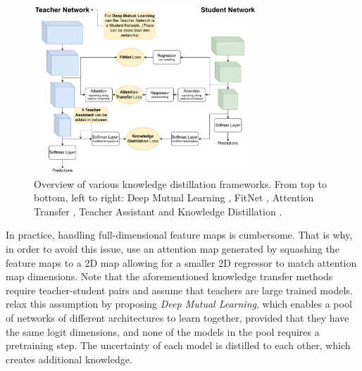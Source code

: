 \begin{figure}[htbp]
    \centering
    \includegraphics[width=0.75\textwidth]{chapter_sota/assets/kd_frameworks.pdf}
    \caption{Overview of various knowledge distillation frameworks. From top to
    bottom, left to right: Deep Mutual Learning
    \cite{DBLP:conf/cvpr/ZhangXHL18}, FitNet
    \cite{DBLP:journals/corr/RomeroBKCGB14}, Attention Transfer
    \cite{DBLP:conf/iclr/ZagoruykoK17}, Teacher Assistant
    \cite{DBLP:conf/aaai/MirzadehFLLMG20} and Knowledge Distillation
    \cite{DBLP:journals/corr/HintonVD15}.}
    \label{fig:sota:kd_frameworks}
\end{figure}

In practice, handling full-dimensional feature maps is cumbersome. That is why,
in order to avoid this issue, \cite{DBLP:conf/iclr/ZagoruykoK17} use an
attention map generated by squashing the feature maps to a 2D map allowing for a
smaller 2D regressor to match attention map dimensions. Note that the
aforementioned knowledge transfer methods require teacher-student pairs and
assume that teachers are large trained models. \cite{DBLP:conf/cvpr/ZhangXHL18}
relax this assumption by proposing \emph{Deep Mutual Learning}, which enables a pool
of networks of different architectures to learn together, provided that they
have the same logit dimensions, and none of the models in the pool requires a
pretraining step. The uncertainty of each model is distilled to each other,
which creates additional knowledge.\\

